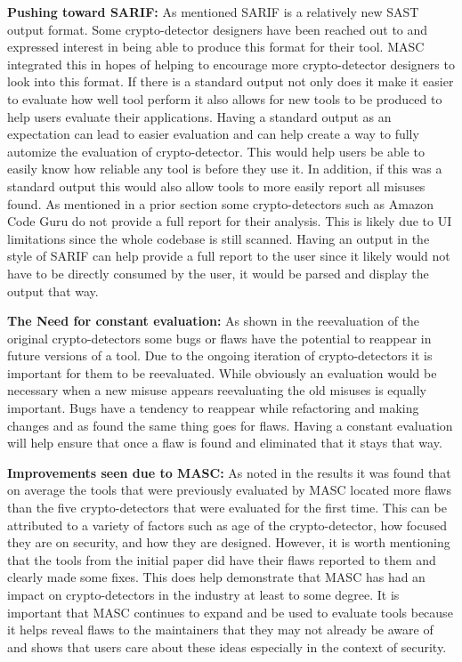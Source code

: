 \textbf{Pushing toward SARIF:}
As mentioned SARIF is a relatively new SAST output format. Some crypto-detector designers have been reached out to and expressed interest in being able to produce this format for their tool. MASC integrated this in hopes of helping to encourage more crypto-detector designers to look into this format. If there is a standard output not only does it make it easier to evaluate how well tool perform it also allows for new tools to be produced to help users evaluate their applications. Having a standard output as an expectation can lead to easier evaluation and can help create a way to fully automize the evaluation of crypto-detector. This would help users be able to easily know how reliable any tool is before they use it. In addition, if this was a standard output this would also allow tools to more easily report all misuses found. As mentioned in a prior section some crypto-detectors such as Amazon Code Guru do not provide a full report for their analysis. This is likely due to UI limitations since the whole codebase is still scanned. Having an output in the style of SARIF can help provide a full report to the user since it likely would not have to be directly consumed by the user, it would be parsed and display the output that way. 

\textbf{The Need for constant evaluation:}
As shown in the reevaluation of the original crypto-detectors some bugs or flaws have the potential to reappear in future versions of a tool. Due to the ongoing iteration of crypto-detectors it is important for them to be reevaluated. While obviously an evaluation would be necessary when a new misuse appears reevaluating the old misuses is equally important. Bugs have a tendency to reappear while refactoring and making changes and as found the same thing goes for flaws. Having a constant evaluation will help ensure that once a flaw is found and eliminated that it stays that way.

\textbf{Improvements seen due to MASC:}
As noted in the results it was found that on average the tools that were previously evaluated by MASC located more flaws than the five crypto-detectors that were evaluated for the first time. This can be attributed to a variety of factors such as age of the crypto-detector, how focused they are on security, and how they are designed. However, it is worth mentioning that the tools from the initial paper did have their flaws reported to them and clearly made some fixes. This does help demonstrate that MASC has had an impact on crypto-detectors in the industry at least to some degree. It is important that MASC continues to expand and be used to evaluate tools because it helps reveal flaws to the maintainers that they may not already be aware of and shows that users care about these ideas especially in the context of security.



